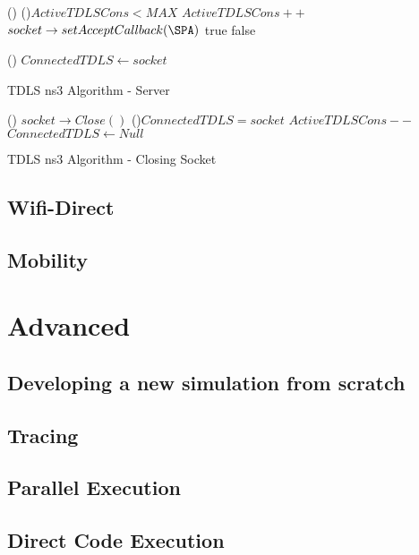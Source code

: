 \documentclass[a4paper]{book}
\begin{document}
\begin{algorithm}[H]
\SetAlgoLined




\Fn(){}{
	\If(){$ActiveTDLSCons < MAX$}{
		\nl $ActiveTDLSCons++$ \;
		\nl $socket \rightarrow setAcceptCallback(\SPA)$ \;
		\nl \Return true\;
	}
	\nl \Return false\;
}

\callback(){}{
	\nl $ConnectedTDLS \gets socket$\;
}




\caption{TDLS ns3 Algorithm - Server\label{tdlsAlgS}}
\end{algorithm}

\begin{algorithm}[H]
\SetAlgoLined

\Fn(){}{
	\nl $socket \rightarrow Close()$ \;
	\If(){$ConnectedTDLS = socket$}{
		\nl $ActiveTDLSCons--$ \;
		\nl $ConnectedTDLS \gets Null$ \;
	}
}

\caption{TDLS ns3 Algorithm - Closing Socket\label{tdlsAlgS}}
\end{algorithm}

\section{Wifi-Direct}

\section{Mobility}

\chapter{Advanced}

\section{Developing a new simulation from scratch}


\section{Tracing}

\section{Parallel Execution}


\section{Direct Code Execution}


\nocite{2015ns3_manual}
\nocite{lacage2006yet}
 
\end{document}
